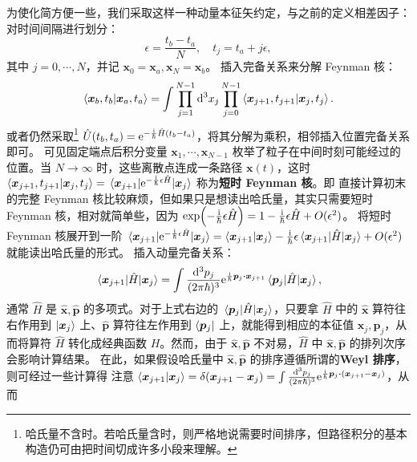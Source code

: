 为使化简方便一些，我们采取这样一种动量本征矢约定，与之前的定义相差因子：
对时间间隔进行划分：
\[
    \epsilon=\frac{t_b-t_a}{N},\quad t_j=t_a+j\epsilon,
\]
其中 $j=0,\cdots,N$，并记 $\bm x_0=\bm x_a, \bm x_N=\bm x_b$。
插入完备关系来分解 Feynman 核：
\[
    \ip{\bm x_b,t_b}{\bm x_a,t_a}=\int \prod_{j=1}^{N-1}\d[3]{x_j} \prod_{j=0}^{N-1} \ip{\bm x_{j+1},t_{j+1}}{\bm x_j,t_j}.
\]
或者仍然采取\footnote{哈氏量不含时。若哈氏量含时，则严格地说需要时间排序，但路径积分的基本构造仍可由把时间切成许多小段来理解。} $\hat U(t_b,t_a)=\mathrm{e}^{-\frac{\mathrm{i}}{\hbar}\hat H(t_b-t_a)}$，将其分解为乘积，相邻插入位置完备关系即可。
可见固定端点后积分变量 $\bm x_1,\cdots,\bm x_{N-1}$ 枚举了粒子在中间时刻可能经过的位置。当 $N\to\infty$ 时，这些离散点连成一条路径 $\bm x(t)$，这时 $\ip{\bm x_{j+1},t_{j+1}}{\bm x_j,t_j} = \mel{\bm x_{j+1}}{\e^{-\frac{\i}{\hbar}\epsilon\hat H}}{\bm x_j}$ 称为\textbf{短时 Feynman 核}。即
直接计算初末的完整 Feynman 核比较麻烦，但如果只是想读出哈氏量，其实只需要短时 Feynman 核，相对就简单些，因为 $\exp(-\frac{\mathrm{i}}{\hbar}\epsilon\hat H)=1 - \frac{\mathrm{i}}{\hbar}\epsilon\hat H + O(\epsilon^2)$。
将短时 Feynman 核展开到一阶 $\mel{\bm x_{j+1}}{\e^{-\frac{\i}{\hbar}\epsilon\hat H}}{\bm x_j} = \ip{\bm x_{j+1}}{\bm x_j} - \frac{\i}{\hbar}\epsilon\mel{\bm x_{j+1}}{\hat H}{\bm x_j} + O(\epsilon^2)$ 就能读出哈氏量的形式。
插入动量完备关系：
\[
    \mel{\bm x_{j+1}}{\hat H}{\bm x_j} = \int\frac{\d[3]{p_j}}{(2\pi\hbar)^3} \e^{\frac{\i}{\hbar}\bm p_j\vdot \bm x_{j+1}} \mel{\bm p_j}{\hat H}{\bm x_j},
\]
通常 $\hat H$ 是 $\hat{\bm x},\hat{\bm p}$ 的多项式。对于上式右边的 $\mel{\bm p_j}{\hat H}{\bm x_j}$，只要拿 $\hat H$ 中的 $\hat{\bm x}$ 算符往右作用到 $\ket{\bm x_j}$ 上、$\hat{\bm p}$ 算符往左作用到 $\bra{\bm p_j}$ 上，就能得到相应的本征值 $\bm x_j,\bm p_j$，从而将算符 $\hat H$ 转化成经典函数 $H$。然而，由于 $\hat{\bm x},\hat{\bm p}$ 不对易，$\hat H$ 中 $\hat{\bm x},\hat{\bm p}$ 的排列次序会影响计算结果。
在此，如果假设哈氏量中 $\hat{\bm x},\hat{\bm p}$ 的排序遵循所谓的\textbf{Weyl 排序}，则可经过一些计算得
注意 $\ip{\bm x_{j+1}}{\bm x_j}=\delta(\bm x_{j+1}-\bm x_j) = \int\frac{\d[3]{p_j}}{(2\pi\hbar)^3} \e^{\frac{\i}{\hbar}\bm p_j\vdot(\bm x_{j+1}-\bm x_j)}$，从而

